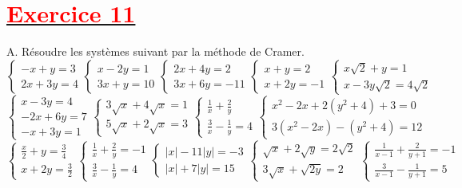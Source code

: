 \documentclass[12pt]{article}
\begin{document}
\section*{\underline{\textbf{\textcolor{red}{Exercice 11}}}}
A. Résoudre les systèmes suivant par la méthode de Cramer.\\
\begin{equation*}
\begin{cases}
-x+y=3 \\
2x+3y = 4
\end{cases}
\begin{cases}
x-2y = 1 \\
3x+y = 10
\end{cases}
\begin{cases}
2x+4y = 2 \\
3x+6y = -11
\end{cases}
\begin{cases}
x+y = 2 \\
x+2y = -1
\end{cases}
\begin{cases}
x\sqrt{2}+y = 1 \\
x-3y\sqrt{2} = 4\sqrt{2}
\end{cases}
\end{equation*}
\begin{equation*}
\begin{cases}
x-3y=4\\
-2x+6y=7\\
-x+3y=1
\end{cases}
\begin{cases}
3\sqrt{x}+4\sqrt{x}=1\\
5\sqrt{x}+2\sqrt{x}=3
\end{cases}
\begin{cases}
\frac{1}{x}+\frac{2}{y}\\
\frac{3}{x}-\frac{1}{y}=4
\end{cases}
\begin{cases}
x^{2}-2x+2(y^{2}+4)+3=0\\
3(x^{2}-2x)-(y^{2}+4)=12
\end{cases}
\end{equation*}
\begin{equation*}
\begin{cases}
\frac{x}{2}+y=\frac{3}{4} \\
x+2y = \frac{3}{2}
\end{cases}
\begin{cases}
\frac{1}{x}+\frac{2}{y} = -1 \\
\frac{3}{x}-\frac{1}{y} = 4 
\end{cases}
\begin{cases}
|x|-11|y| = -3 \\
|x|+7|y| = 15
\end{cases}
\begin{cases}
\sqrt{x}+2\sqrt{y}= 2\sqrt{2} \\
3\sqrt{x}+\sqrt{2y}= 2
\end{cases}
\begin{cases}
\frac{1}{x-1}+\frac{2}{y+1} = -1 \\
\frac{3}{x-1}-\frac{1}{y+1} = 5
\end{cases}
\end{equation*}
\end{document}
